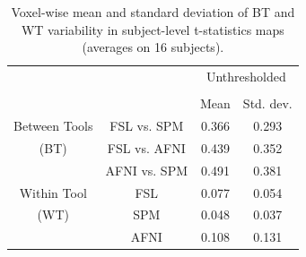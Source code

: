 \documentclass[conference]{IEEEtran}
\begin{document}
\setlength{\tabcolsep}{5pt}
\begin{table}[h]
    \centering
    \begin{tabular}{cccc}
        \toprule
        \multirow{2}{*}{}& {} & \multicolumn{2}{c}{Unthresholded} \\
        \cmidrule{3-4} \\
        {} & {} & Mean & Std. dev. \\
        \midrule
        \rowcolor{lightgray}
        {Between Tools} & FSL vs. SPM        &  0.366       & 0.293     \\
        \rowcolor{lightgray}
        {(BT)} & FSL vs. AFNI                &  0.439       & 0.352     \\
        \rowcolor{lightgray}
        {} & AFNI vs. SPM                    &  0.491       & 0.381     \\
        {Within Tool} & FSL                  &  0.077       & 0.054     \\
        {(WT)}   & SPM                       &  0.048       & 0.037     \\
        {}   & AFNI                          &  0.108       & 0.131     \\
        \bottomrule
    \end{tabular} 
    \caption{Voxel-wise mean and standard deviation of BT and WT variability
    in subject-level t-statistics maps (averages on 16 subjects).}
    \label{table:unthresh-maps-subjects}
\end{table}


\begin{figure}[ht]
\end{figure}
\end{document}

